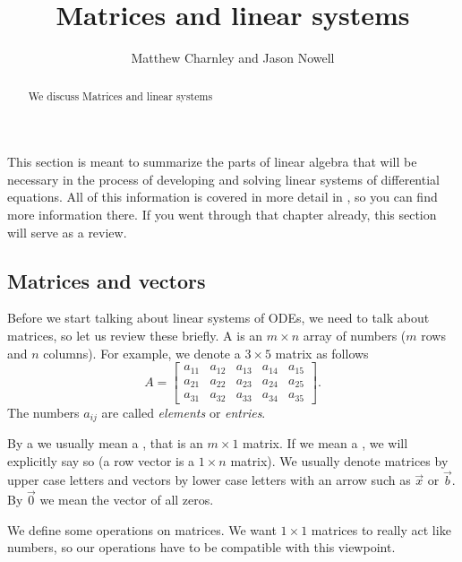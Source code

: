 \documentclass{ximera}
\title{Matrices and linear systems}
\author{Matthew Charnley and Jason Nowell}
\begin{document}
\begin{abstract}
    We discuss Matrices and linear systems
\end{abstract}
\maketitle

\label{sec:matrix}

This section is meant to summarize the parts of linear algebra that will be necessary in the process of developing and solving linear systems of differential equations. All of this information is covered in more detail in , so you can find more information there. If you went through that chapter already, this section will serve as a review.

\subsection{Matrices and vectors}

Before we start talking about linear systems of ODEs, we need to talk about matrices, so let us review these briefly.  A \emph{} is an $m \times n$ array of numbers ($m$ rows and $n$ columns).  For example, we denote a $3 \times 5$ matrix as follows
\begin{equation*}
    A = 
    \begin{bmatrix}
        a_{11} & a_{12} & a_{13} & a_{14} & a_{15} \\
        a_{21} & a_{22} & a_{23} & a_{24} & a_{25} \\
        a_{31} & a_{32} & a_{33} & a_{34} & a_{35}
    \end{bmatrix} .
\end{equation*}
The numbers $a_{ij}$ are called \emph{elements} or \emph{entries}.

By a \emph{} we usually mean a \emph{}, that is an $m \times 1$ matrix. If we mean a \emph{}, we will explicitly say so (a row vector is a $1 \times n$ matrix). We usually denote matrices by upper case letters and vectors by lower case letters with an arrow such as $\vec{x}$ or $\vec{b}$.  By $\vec{0}$ we mean the vector of all zeros.

We define some operations on matrices.  We want $1 \times 1$ matrices to really act like numbers, so our operations have to be compatible with this viewpoint.
\end{document}
